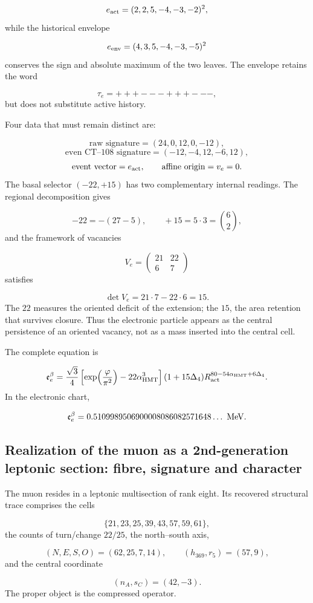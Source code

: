 \[
 e_{\rm act}=(2,2,5,-4,-3,-2)^2,
\]
while the historical envelope

\[
 e_{\rm env}=(4,3,5,-4,-3,-5)^2
\]
conserves the sign and absolute maximum of the two leaves. The envelope retains the word

\[
 \tau_e=+++---+++---,
\]
but does not substitute active history.

Four data that must remain distinct are:

\[
 \text{raw signature}=(24,0,12,0,-12),
\]
\[
 \text{even CT--108 signature}=(-12,-4,12,-6,12),
\]
\[
 \text{event vector}=e_{\rm act},
\qquad
 \text{affine origin}=v_e=0.
\]
The basal selector \((-22,+15)\) has two complementary internal readings. The regional decomposition gives

\[
 -22=-(27-5),\qquad +15=5\cdot3=\binom62,
\]
and the framework of vacancies

\[
 V_e=
 \begin{pmatrix}
 21&22\\
 6&7
 \end{pmatrix}
\]
satisfies

\[
 \det V_e=21\cdot7-22\cdot6=15.
\]
The \(22\) measures the oriented deficit of the extension; the \(15\), the area retention that survives closure. Thus the electronic particle appears as the central persistence of an oriented vacancy, not as a mass inserted into the central cell.

The complete equation is

\[
 \mathfrak e_e^\beta=
 \frac{\sqrt3}{4}
 \left[
 \exp\!\left(\frac{\varphi}{\pi^2}\right)
 -22\alpha_{\rm HMT}^{3}
 \right]
 (1+15\Delta_4)
 R_{\rm act}^{80-54\alpha_{\rm HMT}+6\Delta_4}.
\]
In the electronic chart,

\[
 \mathfrak e_e^\beta
 =0.5109989506900008086082571648\ldots\ {\rm MeV}.
\]
\subsection{Realization of the muon as a 2nd-generation leptonic section: fibre, signature and character}
The muon resides in a leptonic multisection of rank eight. Its recovered structural trace comprises the cells

\[
 \{21,23,25,39,43,57,59,61\},
\]
the counts of turn/change \(22/25\), the north--south axis,

\[
 (N,E,S,O)=(62,25,7,14),
\qquad
 (h_{369},r_5)=(57,9),
\]
and the central coordinate

\[
 (n_A,s_C)=(42,-3).
\]
The proper object is the compressed operator.

